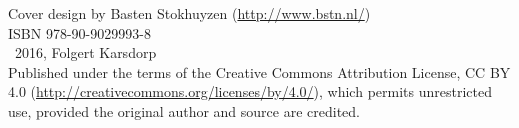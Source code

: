\vspace*{\fill}
\thispagestyle{empty}%
\noindent Cover design by Basten Stokhuyzen (\url{http://www.bstn.nl/})\vspace{0.1cm}\\
ISBN 978-90-9029993-8\vspace{0.1cm}\\
\textcopyright\ 2016, Folgert Karsdorp\vspace{0.1cm}\\
Published under the terms of the Creative Commons Attribution License, CC BY 4.0 (\url{http://creativecommons.org/licenses/by/4.0/}), which permits unrestricted use, provided the original author and source are credited.
\clearpage